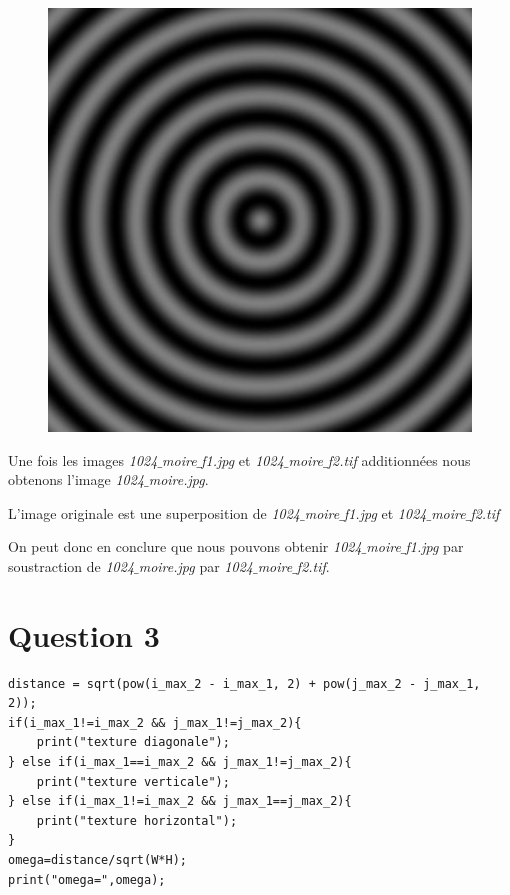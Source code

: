 \documentclass[a4paper,12pt]{report}
\begin{document}
\begin{figure}[!ht]
		\includegraphics[scale=0.1]{image/1024_moire_f2.png}	
\end{figure}
Une fois les images \textit{1024$\_$moire$\_$f1.jpg} et \textit{1024$\_$moire$\_$f2.tif} additionnées nous obtenons l'image \textit{1024$\_$moire.jpg}.

L'image originale est une superposition de \textit{1024$\_$moire$\_$f1.jpg} et \textit{1024$\_$moire$\_$f2.tif}

On peut donc en conclure que nous pouvons obtenir  \textit{1024$\_$moire$\_$f1.jpg} par soustraction de  \textit{1024$\_$moire.jpg} par \textit{1024$\_$moire$\_$f2.tif}.

\section*{Question 3}

\begin{lstlisting}[float,style=Java,caption={Code question 3 et 4},label=lst:question34]
distance = sqrt(pow(i_max_2 - i_max_1, 2) + pow(j_max_2 - j_max_1, 2));
if(i_max_1!=i_max_2 && j_max_1!=j_max_2){
	print("texture diagonale");
} else if(i_max_1==i_max_2 && j_max_1!=j_max_2){
	print("texture verticale");
} else if(i_max_1!=i_max_2 && j_max_1==j_max_2){
	print("texture horizontal");
}
omega=distance/sqrt(W*H);
print("omega=",omega);
\end{lstlisting}
\end{document}
